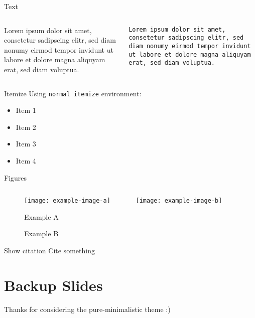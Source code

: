 \maketitle

\begin{frame}{Text}
    \begin{columns}[T]
        \begin{column}{.48\linewidth}
            Lorem ipsum dolor sit amet, consetetur sadipscing elitr,
            sed diam nonumy eirmod tempor invidunt ut labore et dolore
            magna aliquyam erat, sed diam voluptua.
        \end{column}
        \begin{column}{.48\linewidth}
            \texttt{Lorem ipsum dolor sit amet,
            consetetur sadipscing elitr,
            sed diam nonumy eirmod tempor invidunt ut labore et dolore
            magna aliquyam erat, sed diam voluptua.}
        \end{column}
    \end{columns}
\end{frame}

\begin{frame}{Itemize}
    Using \texttt{normal itemize} environment:
    \begin{itemize}
        \item Item 1
        \item Item 2
        \item Item 3
        \item Item 4
    \end{itemize}
\end{frame}

\begin{frame}{Figures}
    \begin{figure}[H]
        \centering
        \begin{columns}[T]
            \begin{column}{.4\linewidth}
                \texttt{[image: example-image-a]}
                \caption{Example A}
            \end{column}
            \begin{column}{.4\linewidth}
                \texttt{[image: example-image-b]}
                \caption{Example B}
            \end{column}
        \end{columns}
    \end{figure}
\end{frame}

\begin{frame}{Show citation}
    Cite something \cite{AlexNet}
    \vfill
    \printbibliography
\end{frame}

\section*{Backup Slides}
\begin{frame}
  \centering
  \vfill
  {\fontsize{30}{40}\selectfont Thanks for considering the pure-minimalistic theme :)}
  \vfill
\end{frame}

